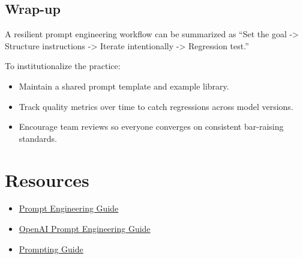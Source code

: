 ﻿\documentclass[12pt]{article}
\begin{document}
\subsection{Wrap-up}
A resilient prompt engineering workflow can be summarized as ``Set the goal -> Structure instructions -> Iterate intentionally -> Regression test.''

To institutionalize the practice:
\begin{itemize}[leftmargin=*,itemsep=0.4em]
  \item Maintain a shared prompt template and example library.
  \item Track quality metrics over time to catch regressions across model versions.
  \item Encourage team reviews so everyone converges on consistent bar-raising standards.
\end{itemize}

\section*{Resources}
\begin{itemize}[leftmargin=*,itemsep=0.4em]
  \item \href{https://prompt-engineering.xiniushu.com/}{Prompt Engineering Guide}
  \item \href{https://platform.openai.com/docs/guides/prompt-engineering}{OpenAI Prompt Engineering Guide}
  \item \href{https://www.promptingguide.ai/}{Prompting Guide}
\end{itemize}
\end{document}
